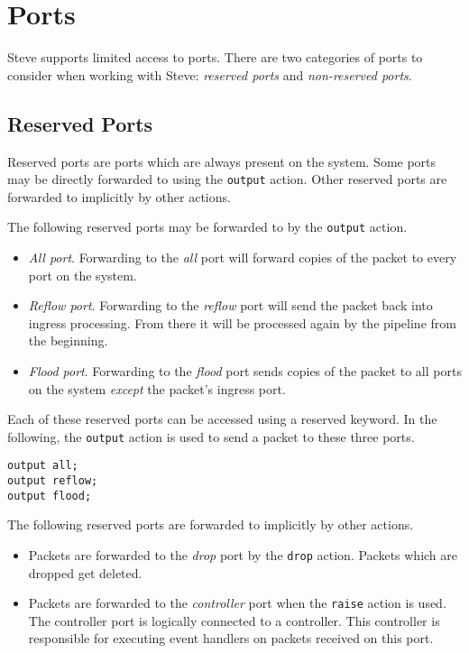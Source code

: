 \section{Ports} \label{tut:ports}

Steve supports limited access to ports.
There are two categories of ports to consider when working with Steve: 
\textit{reserved ports} and
\textit{non-reserved ports}.

\subsection {Reserved Ports} \label{tut:reserved_ports}

Reserved ports are ports which are always present on the system. Some ports may
be directly forwarded to using the \texttt{output} action. Other reserved ports 
are forwarded to implicitly by other actions.

The following reserved ports may be forwarded to by the \texttt{output} action.

\begin{itemize}
\item \emph{All port}. Forwarding to the \textit{all} port will forward copies of the packet to
every port on the system.

\item \emph{Reflow port}. Forwarding to the \textit{reflow} port will send the packet back into
ingress processing. From there it will be processed again by the pipeline from
the beginning.

\item \emph{Flood port}. Forwarding to the \textit{flood} port sends copies of the packet to all
ports on the system \textit{except} the packet's ingress port.
\end{itemize}

Each of these reserved ports can be accessed using a reserved keyword. In the
following, the \texttt{output} action is used to send a packet to these three
ports.

\begin{codepage}
\begin{lstlisting}
output all;
output reflow;
output flood;
\end{lstlisting}
\end{codepage}

The following reserved ports are forwarded to implicitly by other actions.

\begin{itemize}
\item Packets are forwarded to the \textit{drop} port by the \texttt{drop} action.
Packets which are dropped get deleted.

\item Packets are forwarded to the \textit{controller} port when the 
\texttt{raise} action is used.
The controller port is logically connected to a controller.
This controller is responsible for executing event handlers on packets
received on this port. 
\end{itemize}

